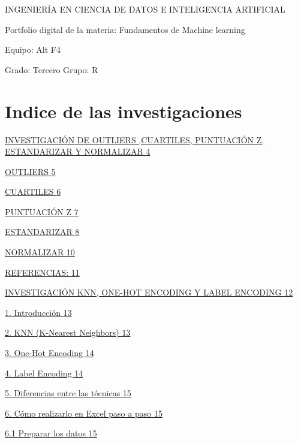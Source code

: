 \documentclass[]{article}
\author{}
\date{}
\begin{document}
INGENIERÍA EN CIENCIA DE DATOS E INTELIGENCIA ARTIFICIAL

Portfolio digital de la materia: Fundamentos de Machine learning

Equipo: Alt F4

Grado: Tercero Grupo: R

\section{Indice de las investigaciones}\label{indice}

\hyperref[investigaciuxf3n-de-outliers-cuartiles-puntuaciuxf3n-z-estandarizar-y-normalizar]{INVESTIGACIÓN
DE OUTLIERS ,CUARTILES, PUNTUACIÓN Z, ESTANDARIZAR Y NORMALIZAR
\hyperref[investigaciuxf3n-de-outliers-cuartiles-puntuaciuxf3n-z-estandarizar-y-normalizar]{4}}

\hyperref[outliers]{OUTLIERS \hyperref[outliers]{5}}

\hyperref[cuartiles]{CUARTILES \hyperref[cuartiles]{6}}

\hyperref[puntuaciuxf3n-z]{PUNTUACIÓN Z \hyperref[puntuaciuxf3n-z]{7}}

\hyperref[estandarizar]{ESTANDARIZAR \hyperref[estandarizar]{8}}

\hyperref[normalizar]{NORMALIZAR \hyperref[normalizar]{10}}

\hyperref[referencias]{REFERENCIAS: \hyperref[referencias]{11}}

\hyperref[investigaciuxf3n-knn-one-hot-encoding-y-label-encoding]{INVESTIGACIÓN
KNN, ONE-HOT ENCODING Y LABEL ENCODING
\hyperref[investigaciuxf3n-knn-one-hot-encoding-y-label-encoding]{12}}

\hyperref[introducciuxf3n]{1. Introducción
\hyperref[introducciuxf3n]{13}}

\hyperref[knn-k-nearest-neighbors]{2. KNN (K-Nearest Neighbors)
\hyperref[knn-k-nearest-neighbors]{13}}

\hyperref[one-hot-encoding]{3. One-Hot Encoding
\hyperref[one-hot-encoding]{14}}

\hyperref[label-encoding]{4. Label Encoding
\hyperref[label-encoding]{14}}

\hyperref[diferencias-entre-las-tuxe9cnicas]{5. Diferencias entre las
técnicas \hyperref[diferencias-entre-las-tuxe9cnicas]{15}}

\hyperref[cuxf3mo-realizarlo-en-excel-paso-a-paso]{6. Cómo realizarlo en
Excel paso a paso
\hyperref[cuxf3mo-realizarlo-en-excel-paso-a-paso]{15}}

\hyperref[preparar-los-datos]{6.1 Preparar los datos
\hyperref[preparar-los-datos]{15}}
\end{document}
